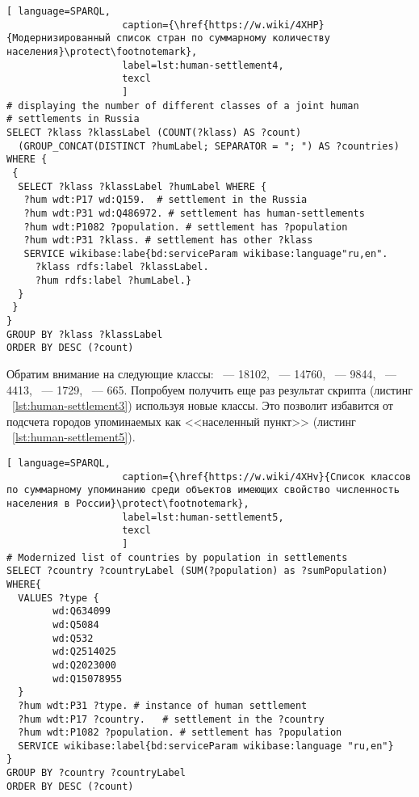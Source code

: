 \begin{lstlisting}[ language=SPARQL, 
                    caption={\href{https://w.wiki/4XHP}{Модернизированный список стран по суммарному количеству населения}\protect\footnotemark},
                    label=lst:human-settlement4,
                    texcl 
                    ]
# displaying the number of different classes of a joint human 
# settlements in Russia
SELECT ?klass ?klassLabel (COUNT(?klass) AS ?count) 
  (GROUP_CONCAT(DISTINCT ?humLabel; SEPARATOR = "; ") AS ?countries) 
WHERE {
 {
  SELECT ?klass ?klassLabel ?humLabel WHERE {
   ?hum wdt:P17 wd:Q159.  # settlement in the Russia
   ?hum wdt:P31 wd:Q486972. # settlement has human-settlements
   ?hum wdt:P1082 ?population. # settlement has ?population
   ?hum wdt:P31 ?klass. # settlement has other ?klass
   SERVICE wikibase:labe{bd:serviceParam wikibase:language"ru,en".
     ?klass rdfs:label ?klassLabel.
     ?hum rdfs:label ?humLabel.}
  }
 }
}
GROUP BY ?klass ?klassLabel
ORDER BY DESC (?count)
\end{lstlisting}%

Обратим внимание на следующие классы: ~--- \num{18102}, ~--- \num{14760}, ~--- \num{9844}, ~--- \num{4413}, ~--- \num{1729},  ~--- \num{665}. Попробуем получить еще раз результат скрипта (листинг ~\protect\ref{lst:human-settlement3}) используя новые классы. Это позволит избавится от подсчета городов упоминаемых как <<населенный пункт>> (листинг ~\protect\ref{lst:human-settlement5}).

\begin{lstlisting}[ language=SPARQL, 
                    caption={\href{https://w.wiki/4XHv}{Список классов по суммарному упоминанию среди объектов имеющих свойство численность населения в России}\protect\footnotemark},
                    label=lst:human-settlement5,
                    texcl 
                    ]
# Modernized list of countries by population in settlements
SELECT ?country ?countryLabel (SUM(?population) as ?sumPopulation) 
WHERE{
  VALUES ?type {
        wd:Q634099
        wd:Q5084
        wd:Q532
        wd:Q2514025
        wd:Q2023000
        wd:Q15078955
  }
  ?hum wdt:P31 ?type. # instance of human settlement
  ?hum wdt:P17 ?country.   # settlement in the ?country
  ?hum wdt:P1082 ?population. # settlement has ?population
  SERVICE wikibase:label{bd:serviceParam wikibase:language "ru,en"}
}
GROUP BY ?country ?countryLabel
ORDER BY DESC (?count)
\end{lstlisting}%

